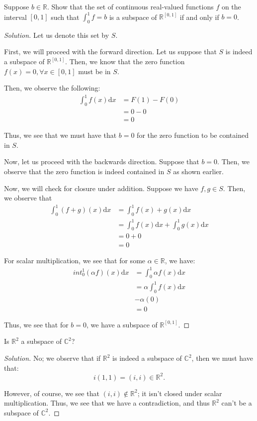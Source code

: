 \documentclass[openany]{book}
\newenvironment{solution}{\begin{proof}[Solution]}{\end{proof}}
\newcommand{\CC}{\mathbb{C}}
\newcommand{\RR}{\mathbb{R}}
\begin{document}
	\begin{hw}
		Suppose $b \in \RR$. Show that the set of continuous real-valued functions $f$ on the interval $\left[ 0,1 \right]$ such that $\int_0^{1} f  = b$ is a subspace of $\RR^{[0,1]}$ if and only if $b = 0$.
	\end{hw}
	\begin{solution}
		Let us denote this set by $S$.
		
		First, we will proceed with the forward direction. Let us suppose that $S$ is indeed a subspace of $\RR^{[0,1]}$. Then, we know that the zero function $f(x) = 0, \forall x \in [0,1]$ must be in $S$.
		
		Then, we observe the following:
		\begin{align*}
			\int_0^{1} f(x) \mathrm dx &= F(1) - F(0) \\
			&= 0 - 0 \\
			&= 0
		\end{align*}
	
		Thus, we see that we must have that $b = 0$ for the zero function to be contained in $S$.
		
		Now, let us proceed with the backwards direction. Suppose that $b = 0$. Then, we observe that the zero function is indeed contained in $S$ as shown earlier.
		
		Now, we will check for closure under addition. Suppose we have $f,g \in S$. Then, we observe that
		\begin{align*}
			\int_{0}^{1} (f+g)(x) \mathrm dx &= \int_0^{1} f(x) + g(x) \mathrm dx \\
			&= \int_{0}^{1} f(x) \mathrm dx + \int_{0}^{1} g(x) \mathrm dx \\
			&= 0 + 0 \\
			&= 0
		\end{align*}
	
		For scalar multiplication, we see that for some $\alpha \in \RR$, we have:
		\begin{align*}
		int_{0}^{1} (\alpha f)(x) \mathrm dx &= \int_{0}^{1} \alpha f(x) \mathrm dx \\
		&= \alpha \int_0^{1} f(x) \mathrm dx \\
		&- \alpha (0) \\
		&= 0 
		\end{align*}
	
		Thus, we see that for $b = 0$, we have a subspace of $\RR^{[0,1]}$.
	\end{solution}
	
	\begin{hw}
		Is $\RR^{2}$ a subspace of $\CC^{2}$?
	\end{hw}
	\begin{solution}
		No; we observe that if $\RR^{2}$ is indeed a subspace of $\CC^{2}$, then we must have that:
		\begin{equation*}
			i(1,1) = (i,i) \in \RR^{2}. 
		\end{equation*}
	
		However, of course, we see that $(i,i) \not\in \RR^{2}$; it isn't closed under scalar multiplication. Thus, we see that we have a contradiction, and thus $\RR^{2}$ can't be a subspace of $\CC^{2}$.
	\end{solution}
\end{document}
